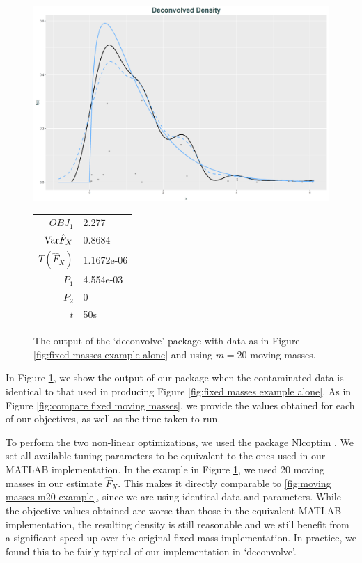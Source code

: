 \begin{figure}
	\centering
	\includegraphics[width = \textwidth]{Figures/Deconvolution/R_example.png}
	\begin{tabular}{r l}
			$OBJ_1$ & 2.277\\
			$\mathrm{Var} \hat{F}_X$ & 0.8684\\
			$T(\hat{F}_X)$ & 1.1672e-06\\
			$P_1$ & 4.554e-03\\
			$P_2$ & 0\\
			$t$ & 50s
		\end{tabular}
	\caption{The output of the `deconvolve' package with data as in Figure \ref{fig:fixed masses example alone} and using $m=20$ moving masses.}
	\label{fig:R example}
\end{figure}

In Figure \ref{fig:R example}, we show the output of our package when the contaminated data is identical to that used in producing Figure \ref{fig:fixed masses example alone}. As in Figure \ref{fig:compare fixed moving masses}, we provide the values obtained for each of our objectives, as well as the time taken to run.

To perform the two non-linear optimizations, we used the package Nlcoptim \cite{Chen2017-mn}. We set all available tuning parameters to be equivalent to the ones used in our MATLAB implementation. In the example in Figure \ref{fig:R example}, we used 20 moving masses in our estimate $\hat{F}_X$. This makes it directly comparable to \ref{fig:moving masses m20 example}, since we are using identical data and parameters. While the objective values obtained are worse than those in the equivalent MATLAB implementation, the resulting density is still reasonable and we still benefit from a significant speed up over the original fixed mass implementation. In practice, we found this to be fairly typical of our implementation in `deconvolve'. 

